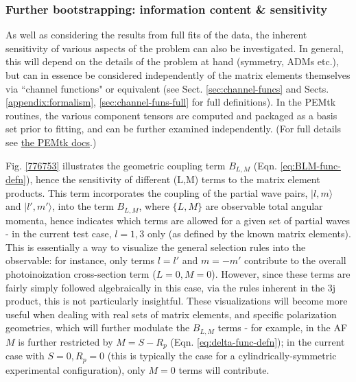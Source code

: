 \documentclass[10pt]{article}
\begin{document}
\subsubsection{Further bootstrapping: information content \& sensitivity\label{sec:bootstrapping-info-sensitivity}}

As well as considering the results from full fits of the data, the inherent sensitivity of various aspects of the problem can also be investigated. In general, this will depend on the details of the problem at hand (symmetry, ADMs etc.), but can in essence be considered independently of the matrix elements themselves via ``channel functions" or equivalent (see Sect. \ref{sec:channel-funcs} and Sects. \ref{appendix:formalism}, \ref{sec:channel-funs-full} for full definitions). In the PEMtk routines, the various component tensors are computed and packaged as a basis set prior to fitting, and can be further examined independently. (For full details see \href{https://pemtk.readthedocs.io/en/latest/fitting/PEMtk_fitting_basis-set_demo_050621-full.html}{the PEMtk docs}.)

Fig. \ref{776753} illustrates the geometric coupling term $B_{L,M}$ (Eqn. \ref{eq:BLM-func-defn}), hence the sensitivity of different (L,M) terms to the matrix element products. This term incorporates the coupling of the partial wave pairs, $|l,m\rangle$ and $|l',m'\rangle$, into the term $B_{L,M}$, where $\{L,M\}$ are observable total angular momenta, 
hence indicates which terms are allowed for a given set of partial waves - in the current test case, $l=1,3$ only (as defined by the known matrix elements). This is essentially a way to visualize the general selection rules into the observable: for instance, only terms $l=l'$ and $m=-m'$ contribute to the overall photoinoization cross-section term ($L=0, M=0$). However, since these terms are fairly simply followed algebraically in this case, via the rules inherent in the 3j product, this is not particularly insightful. These visualizations will become more useful when dealing with real sets of matrix elements, and specific polarization geometries, which will further modulate the $B_{L,M}$ terms - for example, in the AF $M$ is further restricted by $M = S-R_{p}$ (Eqn. \ref{eq:delta-func-defn}); in the current case with $S=0, R_p=0$ (this is typically the case for a cylindrically-symmetric experimental configuration), only $M=0$ terms will contribute.
\end{document}
